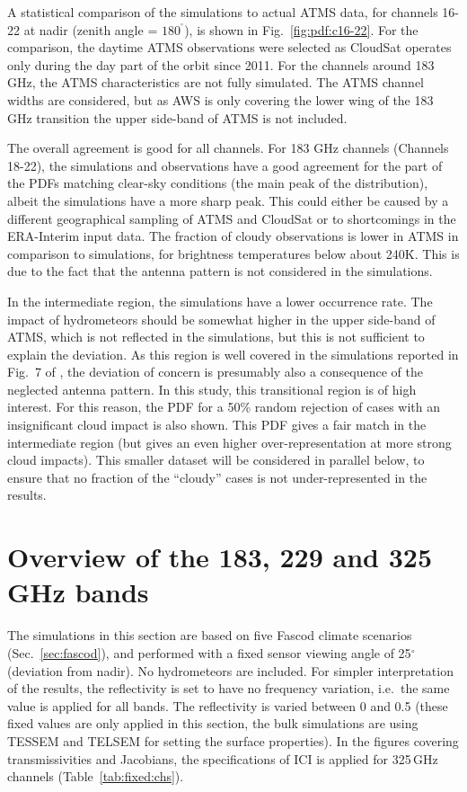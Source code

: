 \documentclass[12pt]{article}
\newcommand{\degree}{\ensuremath{\mathrm{^\circ}}}
\begin{document}
A statistical comparison of the simulations to actual ATMS data, for channels
16-22 at nadir (zenith angle = $180^{\degree}$), is shown in
Fig.~\ref{fig:pdf:c16-22}. For the comparison, the daytime ATMS observations
were selected as CloudSat operates only during the day part of the orbit since
2011. For the channels around 183\,GHz, the ATMS characteristics are not fully
simulated. The ATMS channel widths are considered, but as AWS is only covering
the lower wing of the 183\,GHz transition the upper side-band of ATMS is not
included.

The overall agreement is good for all channels. For 183 GHz channels (Channels
18-22), the simulations and observations have a good agreement for the part of
the PDFs matching clear-sky conditions (the main peak of the distribution),
albeit the simulations have a more sharp peak. This could either be caused by a
different geographical sampling of ATMS and CloudSat or to shortcomings in the
ERA-Interim input data. The fraction of cloudy observations is lower in ATMS in
comparison to simulations, for brightness temperatures below about 240\.K. This
is due to the fact that the antenna pattern is not considered in the
simulations.

In the intermediate region, the simulations have a lower occurrence rate. The
impact of hydrometeors should be somewhat higher in the upper side-band of ATMS,
which is not reflected in the simulations, but this is not sufficient to
explain the deviation. As this region is well covered in the simulations
reported in Fig.~7 of \citet{eriksson:towar:20}, the deviation of concern is
presumably also a consequence of the neglected antenna pattern. In this study,
this transitional region is of high interest. For this reason, the PDF for a
50\% random rejection of cases with an insignificant cloud impact is also
shown. This PDF gives a fair match in the intermediate region (but gives an
even higher over-representation at more strong cloud impacts). This smaller
dataset will be considered in parallel below, to ensure that no fraction of the
``cloudy'' cases is not under-represented in the results.




\section{Overview of the 183, 229 and 325\,GHz bands}
\label{sec:overview}
% 
The simulations in this section are based on five Fascod climate scenarios
(Sec.~\ref{sec:fascod}), and performed with a fixed sensor viewing angle of
25$^\circ$ (deviation from nadir). No hydrometeors are included. For simpler
interpretation of the results, the reflectivity is set to have no frequency
variation, i.e.\ the same value is applied for all bands. The reflectivity is
varied between 0 and 0.5 (these fixed values are only applied in this section,
the bulk simulations are using TESSEM and TELSEM for setting the surface
properties). In the figures covering transmissivities and Jacobians, the
specifications of ICI is applied for 325\,GHz channels
(Table~\ref{tab:fixed:chs}).
\end{document}
